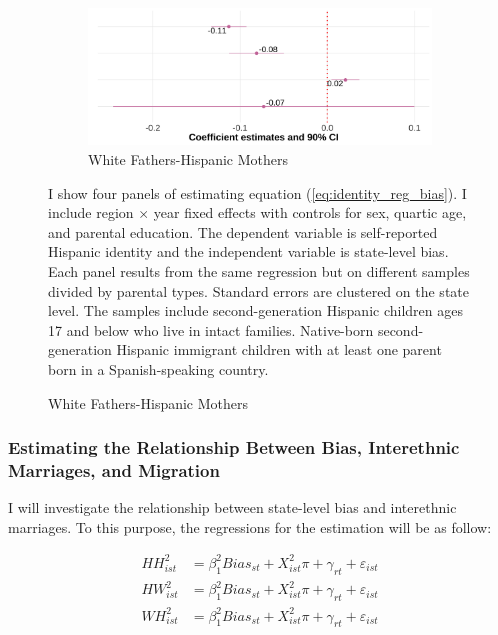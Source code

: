 \documentclass[12pt, fullpage]{article}
\newcommand{\note}[1]{\flushleft\footnotesize{#1}}
\begin{document}
\begin{center}
\begin{figure}[H]
\begin{subfigure}{.48\textwidth}
\caption{White Fathers-Hispanic Mothers}
\centering
\includegraphics[width=.9\linewidth]{figure/by-parents-regs-wh.png}
\end{subfigure}
\flushleft\footnotesize{\note{I show four panels of estimating equation (\ref{eq:identity_reg_bias}). I include region $\times$ year fixed effects with controls for sex, quartic age, and parental education. The dependent variable is self-reported Hispanic identity and the independent variable is state-level bias. Each panel results from the same regression but on different samples divided by parental types. Standard errors are clustered on the state level. The samples include second-generation Hispanic children ages 17 and below who live in intact families. Native-born second-generation Hispanic immigrant children with at least one parent born in a Spanish-speaking country.}}
\end{figure}
\end{center}

\subsubsection{Estimating the Relationship Between Bias, Interethnic Marriages, and Migration} %
\label{sub:the_determinants_of_hispanic_identity}

I will investigate the relationship between state-level bias and interethnic marriages. To this purpose, the regressions for the estimation will be as follow:

\begin{align}
HH_{ist}^2 &= \beta_1^2 Bias_{st} + X_{ist}^2\pi + \gamma_{rt} 
            + \varepsilon_{ist} \nonumber \\
HW_{ist}^2 &= \beta_1^2 Bias_{st} + X_{ist}^2\pi + \gamma_{rt} 
            + \varepsilon_{ist}  \label{eq:inter-hw} \\
WH_{ist}^2 &= \beta_1^2 Bias_{st} + X_{ist}^2\pi + \gamma_{rt} 
            + \varepsilon_{ist}  \nonumber
\end{align}
\end{document}
